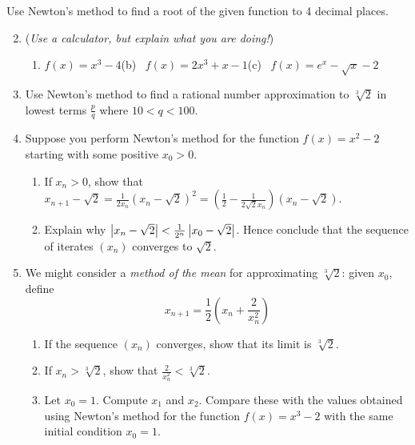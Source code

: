 \begin{exercises}{}{}
	\exstart Use Newton's method to find a root of the given function to 4 decimal places.\vspace{-5pt}
	
	\begin{enumerate}\setcounter{enumi}{1}
  	\item[](\emph{Use a calculator, but explain what you are doing!})
  	\begin{enumerate}
    	\item $f(x)=x^3-4$\qquad (b) \ $f(x)=2x^3+x-1$\qquad (c) \ $f(x)=e^x-\sqrt x-2$
  	\end{enumerate}
  
  
  	\item Use Newton's method to find a rational number approximation to $\sqrt[3]{2}$ in lowest terms $\frac pq$ where $10<q<100$.
  
   
 
  	\item\label{exs:newtonconverge} Suppose you perform Newton's method for the function $f(x)=x^2-2$ starting with some positive $x_0>0$.
  	\begin{enumerate}
    	\item If $x_n>0$, show that $x_{n+1}-\sqrt 2=\frac 1{2x_n}(x_n-\sqrt 2)^2 =\left(\frac 12-\frac 1{2\sqrt 2x_n}\right)(x_n-\sqrt 2)$.
    	\item Explain why $\left| x_n-\sqrt 2\right|<\frac 1{2^n}\left| x_0-\sqrt 2\right|$. Hence conclude that the sequence of iterates $(x_n)$ converges to $\sqrt 2$.
  	\end{enumerate}
	
		
		\item We might consider a \emph{method of the mean} for approximating $\sqrt[3]{2}$: given $x_0$, define
		\[
			x_{n+1}=\frac 12\left(x_n+\frac 2{x_n^2}\right)
		\]
		\begin{enumerate}
		  \item If the sequence $(x_n)$ converges, show that its limit is $\sqrt[3]{2}$.
		  \item If $x_n>\sqrt[3]{2}$, show that $\frac 2{x_n^2}<\sqrt[3]{2}$.
		  \item Let $x_0=1$. Compute $x_1$ and $x_2$. Compare these with the values obtained using Newton's method for the function $f(x)=x^3-2$ with the same initial condition $x_0=1$.
		\end{enumerate}
	

\end{enumerate}
\end{exercises}
